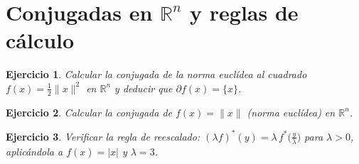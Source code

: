 \documentclass[11pt]{report}
\newtheorem{ex}{Ejercicio}
\newcommand{\R}{\mathbb{R}}
\newcommand{\indic}{I}
\newcommand{\subdiff}{\partial}
\begin{document}
\section{Conjugadas en $\R^n$ y reglas de cálculo}

\begin{ex}
Calcular la conjugada de la norma euclídea al cuadrado
$f(x)=\tfrac12\|x\|^2$ en $\R^n$ y deducir que
$\subdiff f(x)=\{x\}$.
\end{ex}

\begin{ex}
Calcular la conjugada de $f(x)=\|x\|$ (norma euclídea) en $\R^n$.
\end{ex}

\begin{ex}
Verificar la regla de reescalado:
$(\lambda f)^*(y)=\lambda\,f^*\!\bigl(\tfrac{y}{\lambda}\bigr)$
para $\lambda>0$, aplicándola a $f(x)=|x|$ y $\lambda=3$.
\end{ex}
\end{document}
